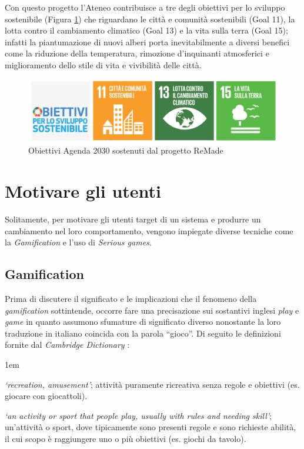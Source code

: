 Con questo progetto l'Ateneo contribuisce a tre degli obiettivi per lo sviluppo sostenibile (Figura \ref{fig:remade_dgs}) che riguardano le città e comunità sostenibili (Goal 11), la lotta contro il cambiamento climatico (Goal 13) e la vita sulla terra (Goal 15); infatti la piantumazione di nuovi alberi porta inevitabilmente a diversi benefici come la riduzione della temperatura, rimozione d'inquinanti atmosferici e miglioramento dello stile di vita e vivibilità delle città.
\begin{figure}
    \centering
    \includegraphics[width=\textwidth]{img/sdg_remade.png}
    \caption{Obiettivi Agenda 2030 sostenuti dal progetto ReMade \cite{remade_project}}
    \label{fig:remade_dgs}
\end{figure}
\newpage
\section{Motivare gli utenti}
Solitamente, per motivare gli utenti target di un sistema e produrre un cambiamento nel loro comportamento, vengono impiegate diverse tecniche come la \textit{Gamification} e l'uso di \textit{Serious games}.
%
%
\subsection{Gamification}
\label{sec:gamification}
Prima di discutere il significato e le implicazioni che il fenomeno della \textit{gamification} sottintende, occorre fare una precisazione sui sostantivi inglesi \textit{play} e \textit{game} in quanto assumono sfumature di significato diverso nonostante la loro traduzione in italiano coincida con la parola \enquote{gioco}. Di seguito le definizioni fornite dal \textit{Cambridge Dictionary} \cite{cambridgeDict}:

\begin{description}
    \itemsep1em
    \item [\textit{Play}] \textit{ \enquote*{recreation, amusement}}; attività puramente ricreativa senza regole e obiettivi (es. giocare con giocattoli).
    \item [\textit{Game}] \textit{\enquote*{an activity or sport that people play, usually with rules and needing skill}}; un'attività o sport, dove tipicamente sono presenti regole e sono richieste abilità, il cui scopo è raggiungere uno o più obiettivi (es. giochi da tavolo).
\end{description}

